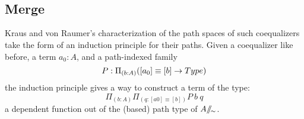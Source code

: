 \begin{code}%
\>[0]\AgdaSpace{}%
\AgdaSpace{}%
\AgdaSymbol{(}\AgdaSpace{}%
\AgdaSymbol{:}\AgdaSpace{}%
\AgdaSymbol{)}\AgdaSpace{}%
\<%
\\
\>[0][@{}l@{\AgdaIndent{0}}]%
\>[2]\AgdaSpace{}%
\AgdaSpace{}%
\AgdaSymbol{:}\AgdaSpace{}%
\AgdaSpace{}%
\<%
\\
\>[2][@{}l@{\AgdaIndent{0}}]%
\>[4]\AgdaSpace{}%
\AgdaSymbol{:}\AgdaSpace{}%
\<%
\\
%
\>[4]%
\>[12]\AgdaSymbol{:}\AgdaSpace{}%
\AgdaSpace{}%
\AgdaSpace{}%
\<%
\\
%
\\[\AgdaEmptyExtraSkip]%
%
\>[2]\AgdaSpace{}%
\AgdaSpace{}%
\AgdaSymbol{:}\AgdaSpace{}%
\AgdaSpace{}%
\<%
\\
\>[2][@{}l@{\AgdaIndent{0}}]%
\>[4]\AgdaOperator{\AgdaInductiveConstructor{[\AgdaUnderscore{}]}}\AgdaSpace{}%
\AgdaSymbol{:}\AgdaSpace{}%
\AgdaSpace{}%
\AgdaSpace{}%
\<%
\\
%
\>[4]%
\>[12]\AgdaSymbol{:}\AgdaSpace{}%
\AgdaSpace{}%
\AgdaSpace{}%
\AgdaSpace{}%
\AgdaOperator{\AgdaInductiveConstructor{[}}\AgdaSpace{}%
\AgdaSpace{}%
\AgdaOperator{\AgdaInductiveConstructor{]}}\AgdaSpace{}%
\AgdaSpace{}%
\AgdaOperator{\AgdaInductiveConstructor{[}}\AgdaSpace{}%
\AgdaSpace{}%
\AgdaSpace{}%
\AgdaOperator{\AgdaInductiveConstructor{]}}\<%
\end{code}

\subsection{Merge}

Kraus and von Raumer's characterization of the path spaces of such coequalizers
take the form of an induction principle for their paths. Given a coequalizer
like before, a term $a_0 : A$, and a path-indexed family
\[P : \Pi_{(b : A)} ([a_0] \equiv [b] \rightarrow Type)\]
the induction principle gives a way to construct a term of the type:
\[\Pi_{(b : A)} \Pi_{(q : [a0] \equiv [b])} P~b~q\]
a dependent function out of the (based) path type of $A /\!\!/\!_{\sim}$.


